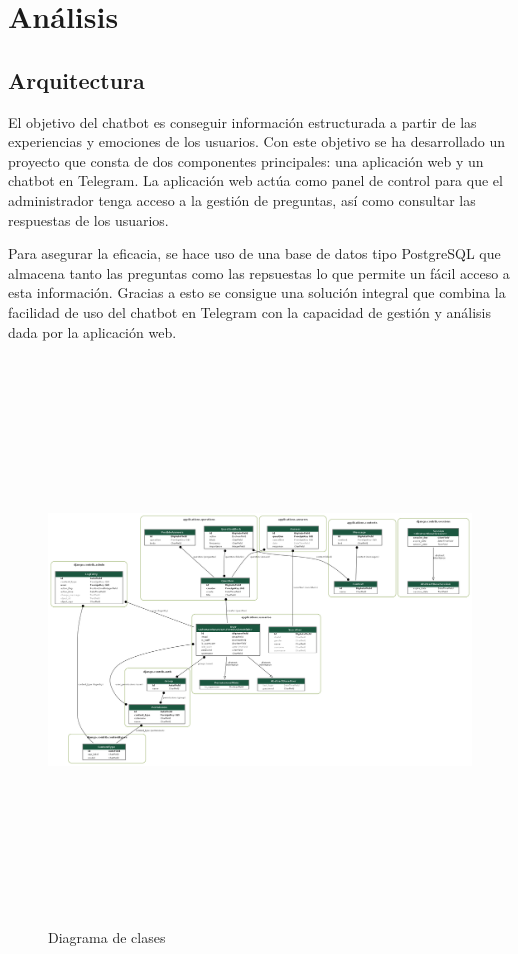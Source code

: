 \chapter{Análisis}

\section{Arquitectura}
El objetivo del chatbot es conseguir información estructurada a partir de las experiencias y emociones de los usuarios. Con este objetivo se ha desarrollado un proyecto que consta de dos componentes principales: una aplicación web y un chatbot en Telegram. La aplicación web actúa como panel de control para que el administrador tenga acceso a la gestión de preguntas, así como consultar las respuestas de los usuarios. 

Para asegurar la eficacia, se hace uso de una base de datos tipo PostgreSQL que almacena tanto las preguntas como las repsuestas lo que permite un fácil acceso a esta información. Gracias a esto se consigue una solución integral que combina la facilidad de uso del chatbot en Telegram con la capacidad de gestión y análisis dada por la aplicación web. \vspace{7cm}


\begin{figure}[!ht]
    \centering
    \includegraphics[width=1\textwidth, height=15cm]{imagenes/myapp_models.png}
    \caption{ Diagrama de clases }
    \label{fig:enter-label}
\end{figure}


